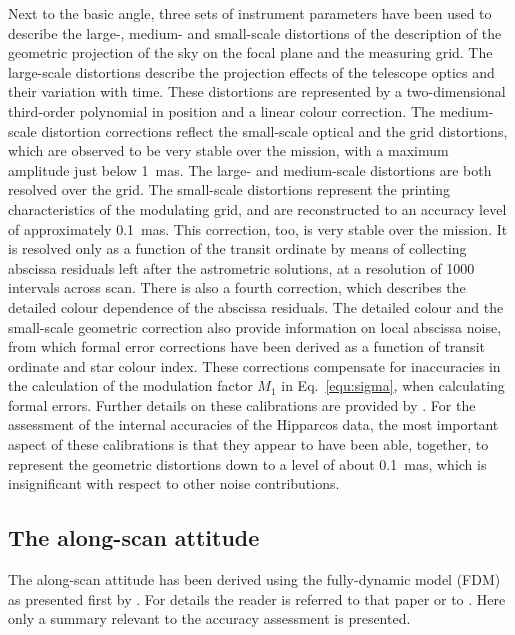 \documentclass{aa}
\begin{document}
Next to the basic angle, three sets of instrument parameters have been 
used to describe the large-, medium- and small-scale distortions of the 
description of the geometric projection of the sky on the focal plane and the 
measuring grid. The large-scale distortions describe the projection effects of 
the telescope optics and their variation with time. These distortions are 
represented by a two-dimensional third-order polynomial in position and a 
linear colour correction.
The medium-scale distortion corrections reflect the small-scale optical and
the grid distortions, which are observed to be very stable over the mission, 
with a maximum amplitude just below 1~mas. The large- and medium-scale 
distortions are both resolved over the grid. The small-scale distortions 
represent the printing characteristics of the modulating grid, and are 
reconstructed to an accuracy level of approximately 0.1~mas. This correction, 
too, is very stable over the mission. It is resolved only as a function of 
the transit ordinate by means of collecting abscissa residuals left after the 
astrometric solutions, at a resolution of 1000 intervals across scan. 
There is also a fourth correction, which describes the detailed colour 
dependence of the abscissa residuals. The detailed colour and the small-scale 
geometric correction also provide information on local abscissa noise, from 
which formal error corrections have been derived as a function of
transit ordinate and star colour index. These corrections compensate for
inaccuracies in the calculation of the modulation factor $M_1$ in 
Eq.~\ref{equ:sigma}, when calculating formal errors. Further details on these 
calibrations are provided by \citet{fvl07}. For the assessment of the 
internal accuracies of the Hipparcos data, the most important aspect of 
these calibrations is that they appear to have been able, together, to 
represent the geometric distortions down to a level of about 0.1~mas, which
is insignificant with respect to other noise contributions.

\subsection{The along-scan attitude}
The along-scan attitude has been derived using the fully-dynamic model (FDM) as
presented first by \citet{fvl05b}. For details the reader is referred to
that paper or to \citet{fvl07}. Here only a summary relevant to the 
accuracy assessment is presented.
\end{document}
